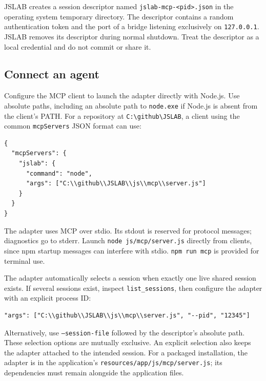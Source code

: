 \documentclass[12pt,a4paper]{article}
\begin{document}
JSLAB creates a session descriptor named \texttt{jslab-mcp-<pid>.json} in the operating system temporary directory. The descriptor contains a random authentication token and the port of a bridge listening exclusively on \texttt{127.0.0.1}. JSLAB removes its descriptor during normal shutdown. Treat the descriptor as a local credential and do not commit or share it.


\subsection{Connect an agent}

Configure the MCP client to launch the adapter directly with Node.js. Use absolute paths, including an absolute path to \texttt{node.exe} if Node.js is absent from the client's PATH. For a repository at \texttt{C:\textbackslash{}github\textbackslash{}JSLAB}, a client using the common \texttt{mcpServers} JSON format can use:

\begin{lstlisting}[style=JavaScriptStyle,language={}]
{
  "mcpServers": {
    "jslab": {
      "command": "node",
      "args": ["C:\\github\\JSLAB\\js\\mcp\\server.js"]
    }
  }
}
\end{lstlisting}

The adapter uses MCP over stdio. Its stdout is reserved for protocol messages; diagnostics go to stderr. Launch \texttt{node js/mcp/server.js} directly from clients, since npm startup messages can interfere with stdio. \texttt{npm run mcp} is provided for terminal use.

The adapter automatically selects a session when exactly one live shared session exists. If several sessions exist, inspect \texttt{list\_sessions}, then configure the adapter with an explicit process ID:

\begin{lstlisting}[style=JavaScriptStyle,language={}]
"args": ["C:\\github\\JSLAB\\js\\mcp\\server.js", "--pid", "12345"]
\end{lstlisting}

Alternatively, use \texttt{--session-file} followed by the descriptor's absolute path. These selection options are mutually exclusive. An explicit selection also keeps the adapter attached to the intended session. For a packaged installation, the adapter is in the application's \texttt{resources/app/js/mcp/server.js}; its dependencies must remain alongside the application files.
\end{document}
